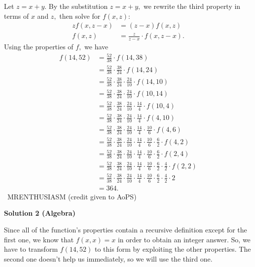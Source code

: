\begin{enumerate}
Let $z = x+y$. By the substitution $z=x+y,$ we rewrite the third property in terms of $x$ and $z,$ then solve for $f(x,z):$
 \begin{align*} zf(x,z-x) &= (z-x)f(x,z) \\ f(x,z) &= \frac{z}{z-x} \cdot f(x,z-x). \end{align*}
Using the properties of $f,$ we have
 \begin{align*} f(14,52) &= \frac{52}{38} \cdot f(14,38) \\ &= \frac{52}{38} \cdot \frac{38}{24} \cdot f(14,24) \\ &= \frac{52}{38} \cdot \frac{38}{24} \cdot \frac{24}{10} \cdot f(14,10)\\ &= \frac{52}{38} \cdot \frac{38}{24} \cdot \frac{24}{10} \cdot f(10,14)\\ &= \frac{52}{38} \cdot \frac{38}{24} \cdot \frac{24}{10} \cdot \frac{14}{4} \cdot f(10,4)\\ &= \frac{52}{38} \cdot \frac{38}{24} \cdot \frac{24}{10} \cdot \frac{14}{4} \cdot f(4,10)\\ &= \frac{52}{38} \cdot \frac{38}{24} \cdot \frac{24}{10} \cdot \frac{14}{4} \cdot \frac{10}{6} \cdot f(4,6)\\ &= \frac{52}{38} \cdot \frac{38}{24} \cdot \frac{24}{10} \cdot \frac{14}{4} \cdot \frac{10}{6} \cdot \frac{6}{2} \cdot f(4,2)\\ &= \frac{52}{38} \cdot \frac{38}{24} \cdot \frac{24}{10} \cdot \frac{14}{4} \cdot \frac{10}{6} \cdot \frac{6}{2} \cdot f(2,4)\\ &= \frac{52}{38} \cdot \frac{38}{24} \cdot \frac{24}{10} \cdot \frac{14}{4} \cdot \frac{10}{6} \cdot \frac{6}{2} \cdot \frac{4}{2} \cdot f(2,2)\\ &= \frac{52}{38} \cdot \frac{38}{24} \cdot \frac{24}{10} \cdot \frac{14}{4} \cdot \frac{10}{6} \cdot \frac{6}{2} \cdot \frac{4}{2} \cdot 2\\ &=\boxed{364}. \end{align*}
~MRENTHUSIASM (credit given to AoPS)

 



\textbf{Solution 2 (Algebra)}

Since all of the function's properties contain a recursive definition except for the first one, we know that $f(x,x) = x$ in order to obtain an integer answer. So, we have to transform $f(14,52)$ to this form by exploiting the other properties. The second one doesn't help us immediately, so we will use the third one. 


\end{enumerate}
